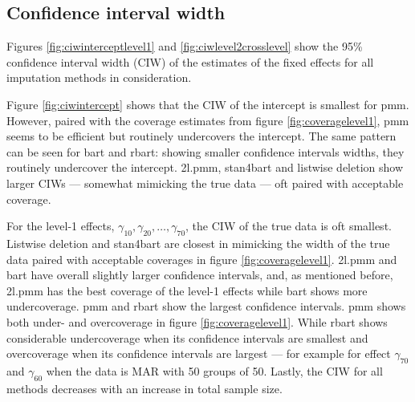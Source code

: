 \documentclass[3p,12pt,a4paper]{elsarticle}
\begin{document}
\subsection{Confidence interval width}
Figures \ref{fig:ciwinterceptlevel1} and \ref{fig:ciwlevel2crosslevel} show the 95\% confidence interval width (CIW) of the estimates of the fixed effects for all imputation methods in consideration.

Figure \ref{fig:ciwintercept} shows that the CIW of the intercept is smallest for pmm. However, paired with the coverage estimates from figure \ref{fig:coveragelevel1}, pmm seems to be efficient but routinely undercovers the intercept. The same pattern can be seen for bart and rbart: showing smaller confidence intervals widths, they routinely undercover the intercept. 2l.pmm, stan4bart and listwise deletion show larger CIWs --- somewhat mimicking the true data --- oft paired with acceptable coverage.

For the level-1 effects, $\gamma_{10}, \gamma_{20},\dots,\gamma_{70}$, the CIW of the true data is oft smallest. Listwise deletion and stan4bart are closest in mimicking the width of the true data paired with acceptable coverages in figure \ref{fig:coveragelevel1}. 2l.pmm and bart have overall slightly larger confidence intervals, and, as mentioned before, 2l.pmm has the best coverage of the level-1 effects while bart shows more undercoverage. pmm and rbart show the largest confidence intervals. pmm shows both under- and overcoverage in figure \ref{fig:coveragelevel1}. While rbart shows considerable undercoverage when its confidence intervals are smallest and overcoverage when its confidence intervals are largest --- for example for effect $\gamma_{70}$ and $\gamma_{60}$ when the data is MAR with 50 groups of 50. Lastly, the CIW for all methods decreases with an increase in total sample size. 
\end{document}
